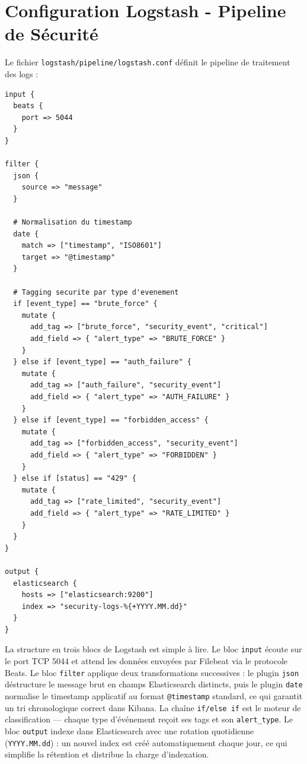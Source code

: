 \documentclass[12pt, a4paper]{report}
\begin{document}
\chapter{Configuration Logstash - Pipeline de Sécurité}

Le fichier \texttt{logstash/pipeline/logstash.conf} définit le pipeline de traitement des logs :

\begin{lstlisting}[style=yaml, caption={Configuration Logstash * input, filter et règles de tagging sécurité}]
input {
  beats {
    port => 5044
  }
}

filter {
  json {
    source => "message"
  }

  # Normalisation du timestamp
  date {
    match => ["timestamp", "ISO8601"]
    target => "@timestamp"
  }

  # Tagging securite par type d'evenement
  if [event_type] == "brute_force" {
    mutate {
      add_tag => ["brute_force", "security_event", "critical"]
      add_field => { "alert_type" => "BRUTE_FORCE" }
    }
  } else if [event_type] == "auth_failure" {
    mutate {
      add_tag => ["auth_failure", "security_event"]
      add_field => { "alert_type" => "AUTH_FAILURE" }
    }
  } else if [event_type] == "forbidden_access" {
    mutate {
      add_tag => ["forbidden_access", "security_event"]
      add_field => { "alert_type" => "FORBIDDEN" }
    }
  } else if [status] == "429" {
    mutate {
      add_tag => ["rate_limited", "security_event"]
      add_field => { "alert_type" => "RATE_LIMITED" }
    }
  }
}

output {
  elasticsearch {
    hosts => ["elasticsearch:9200"]
    index => "security-logs-%{+YYYY.MM.dd}"
  }
}
\end{lstlisting}

\medskip
La structure en trois blocs de Logstash est simple à lire. Le bloc \texttt{input} écoute sur le port TCP 5044 et attend les données envoyées par Filebeat via le protocole Beats. Le bloc \texttt{filter} applique deux transformations successives : le plugin \texttt{json} déstructure le message brut en champs Elasticsearch distincts, puis le plugin \texttt{date} normalise le timestamp applicatif au format \texttt{@timestamp} standard, ce qui garantit un tri chronologique correct dans Kibana. La chaîne \texttt{if/else if} est le moteur de classification — chaque type d'événement reçoit ses tags et son \texttt{alert\_type}. Le bloc \texttt{output} indexe dans Elasticsearch avec une rotation quotidienne (\texttt{YYYY.MM.dd}) : un nouvel index est créé automatiquement chaque jour, ce qui simplifie la rétention et distribue la charge d'indexation.
\end{document}
